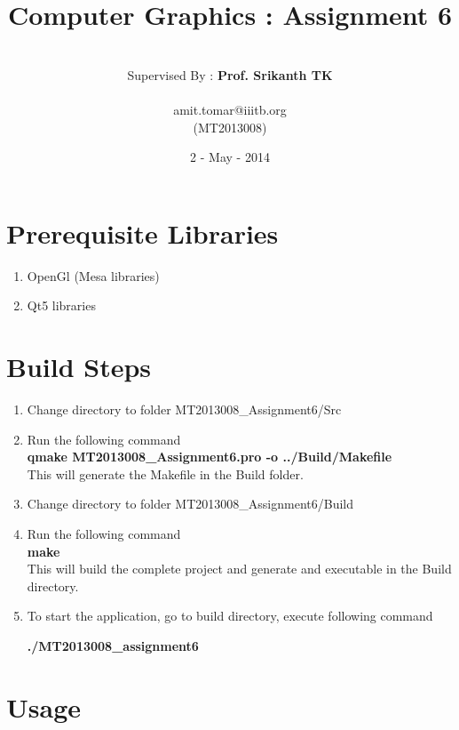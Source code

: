 \documentclass[11pt]{article}
\title{\textbf{Computer Graphics : Assignment 6}}
\author{
		\vspace{ 2 mm}\\
		Supervised By : \textbf{Prof. Srikanth TK}\\
		\vspace {2mm}\\
		amit.tomar@iiitb.org \\
		(MT2013008) \\
		}
\date{2 - May - 2014}
\begin{document}
\lstset{language=C} 
\maketitle

\vspace{ 100 mm}

\section{Prerequisite Libraries}

\begin {enumerate}
\item OpenGl (Mesa libraries)
\item Qt5 libraries
\end {enumerate}

\section{Build Steps}

\begin {enumerate}
\item Change directory to folder MT2013008\_Assignment6/Src
\item Run the following command\\

\textbf{qmake MT2013008\_Assignment6.pro -o ../Build/Makefile} \\

This will generate the Makefile in the Build folder.

\item Change directory to folder MT2013008\_Assignment6/Build

\item Run the following command \\

\textbf{make} \\

This will build the complete project and generate and executable in the Build directory.

\item To start the application, go to build directory, execute following command 

\textbf{./MT2013008\_assignment6}



\end {enumerate}

\section{Usage}
\end{document}
